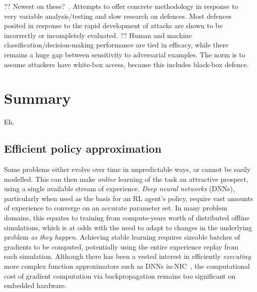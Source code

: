 ?? Newest on these?~\parencite{DBLP:journals/corr/abs-1902-06705}. Attempts to offer concrete methodology in response to very variable analysis/testing and slow research on defences. Most defences posited in response to the rapid development of attacks are shown to be incorrectly or incompletely evaluated. ?? Human and machine classification/decision-making performance are tied in efficacy, while there remains a huge gap between sensitivity to adversarial examples. The norm is to assume attackers have white-box access, because this includes black-box defence.

\section{Summary}
Eh.

\subsection{Efficient policy approximation}
Some problems either evolve over time in unpredictable ways, or cannot be easily modelled.
This can then make \emph{online} learning of the task an attractive prospect, using a single available stream of experience.
\emph{Deep neural networks} (DNNs), particularly when used as the basis for an RL agent's policy, require vast amounts of experience to converge on an accurate parameter set.
In many problem domains, this equates to training from compute-years worth of distributed offline simulations, which is at odds with the need to adapt to changes in the underlying problem \emph{as they happen}.
Achieving stable learning requires sizeable batches of gradients to be computed, potentially using the entire experience replay from each simulation.
Although there has been a vested interest in efficiently \emph{executing} more complex function approximators such as DNNs in-NIC~\parencite{DBLP:journals/corr/abs-2002-08987,DBLP:journals/corr/abs-2009-02353,DBLP:conf/sigcomm/SanvitoSB18,DBLP:journals/corr/abs-1801-05731,langlet-ml-netronome}, the computational cost of gradient computation via backpropagation remains too significant on embedded hardware.


